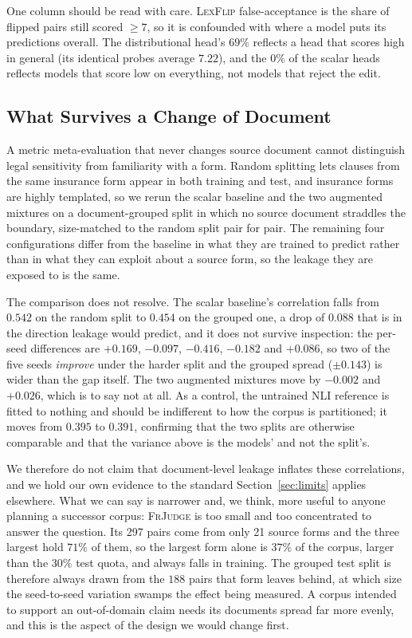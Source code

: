 \documentclass{BVP_JCLLT}
\begin{document}
One column should be read with care. \textsc{LexFlip} false-acceptance is the
share of flipped pairs still scored $\geq 7$, so it is confounded with where a
model puts its predictions overall. The distributional head's $69\%$ reflects a
head that scores high in general (its identical probes average $7.22$), and the
$0\%$ of the scalar heads reflects models that score low on everything, not
models that reject the edit.

\subsection{What Survives a Change of Document}\label{sec:grouped}

A metric meta-evaluation that never changes source document cannot distinguish
legal sensitivity from familiarity with a form. Random splitting lets clauses
from the same insurance form appear in both training and test, and insurance
forms are highly templated, so we rerun the scalar baseline and the two
augmented mixtures on a document-grouped split in which no source document
straddles the boundary, size-matched to the random split pair for pair. The
remaining four configurations differ from the baseline in what they are trained
to predict rather than in what they can exploit about a source form, so the
leakage they are exposed to is the same.

The comparison does not resolve. The scalar baseline's correlation falls from
$0.542$ on the random split to $0.454$ on the grouped one, a drop of $0.088$
that is in the direction leakage would predict, and it does not survive
inspection: the per-seed differences are $+0.169$, $-0.097$, $-0.416$, $-0.182$
and $+0.086$, so two of the five seeds \emph{improve} under the harder split and
the grouped spread ($\pm0.143$) is wider than the gap itself. The two augmented
mixtures move by $-0.002$ and $+0.026$, which is to say not at all. As a
control, the untrained NLI reference is fitted to nothing and should be
indifferent to how the corpus is partitioned; it moves from $0.395$ to $0.391$,
confirming that the two splits are otherwise comparable and that the variance
above is the models' and not the split's.

We therefore do not claim that document-level leakage inflates these
correlations, and we hold our own evidence to the standard
Section~\ref{sec:limits} applies elsewhere. What we can say is narrower and, we
think, more useful to anyone planning a successor corpus: \textsc{FrJudge} is
too small and too concentrated to answer the question. Its 297 pairs come from
only 21 source forms and the three largest hold $71\%$ of them, so the largest
form alone is $37\%$ of the corpus, larger than the $30\%$ test quota, and
always falls in training. The grouped test split is therefore always drawn from
the $188$ pairs that form leaves behind, at which size the seed-to-seed
variation swamps the effect being measured. A corpus intended to support an
out-of-domain claim needs its documents spread far more evenly, and this is the
aspect of the design we would change first.
\end{document}
